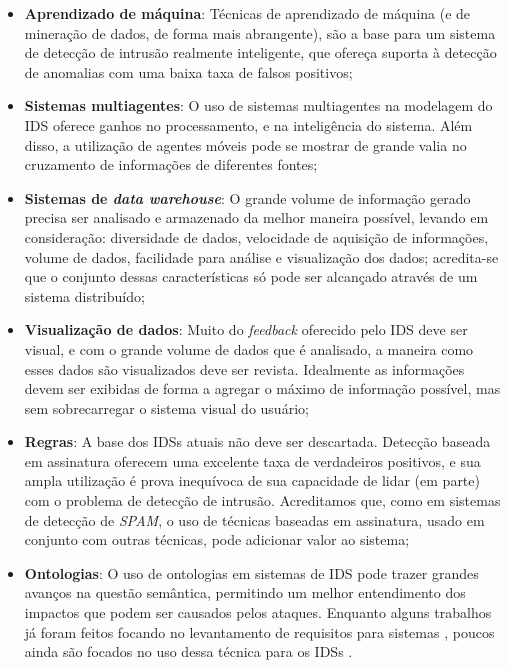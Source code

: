\documentclass[
	12pt,				%
	openright,			%
	twoside,			%
	a4paper,			%
	english,			%
	french,				%
	spanish,			%
	brazil,				%
	]{abntex2}
\begin{document}
\begin{itemize}
	
	\item \textbf{Aprendizado de máquina}: Técnicas de aprendizado de máquina (e de mineração de dados, de forma mais abrangente), são a base para um sistema de detecção de intrusão realmente inteligente, que ofereça suporta à detecção de anomalias com uma baixa taxa de falsos positivos;
	
	\item \textbf{Sistemas multiagentes}: O uso de sistemas multiagentes na modelagem do IDS oferece ganhos no processamento, e na inteligência do sistema. Além disso, a utilização de agentes móveis pode se mostrar de grande valia no cruzamento de informações de diferentes fontes;
	
	\item \textbf{Sistemas de \emph{data warehouse}}: O grande volume de informação gerado precisa ser analisado e armazenado da melhor maneira possível, levando em consideração: diversidade de dados, velocidade de aquisição de informações, volume de dados, facilidade para análise e visualização dos dados; acredita-se que o conjunto dessas características só pode ser alcançado através de um sistema distribuído; 
	
	\item \textbf{Visualização de dados}: Muito do \emph{feedback} oferecido pelo IDS deve ser visual, e com o grande volume de dados que é analisado, a maneira como esses dados são visualizados deve ser revista. Idealmente as informações devem ser exibidas de forma a agregar o máximo de informação possível, mas sem sobrecarregar o sistema visual do usuário;
	
	\item \textbf{Regras}: A base dos IDSs atuais não deve ser descartada. Detecção baseada em assinatura oferecem uma excelente taxa de verdadeiros positivos, e sua ampla utilização é prova inequívoca de sua capacidade de lidar (em parte) com o problema de detecção de intrusão. Acreditamos que, como em sistemas de detecção de \emph{SPAM}, o uso de técnicas baseadas em assinatura, usado em conjunto com outras técnicas, pode adicionar valor ao sistema;
	
	\item \textbf{Ontologias}: O uso de ontologias em sistemas de IDS pode trazer grandes avanços na questão semântica, permitindo um melhor entendimento dos impactos que podem ser causados pelos ataques. Enquanto alguns trabalhos já foram feitos focando no levantamento de requisitos para sistemas \cite{souag2012ontologies}, poucos ainda são focados no uso dessa técnica para os IDSs \cite{patel2013intrusion, sadighian2014ontids}.
	
\end{itemize}
\end{document}
